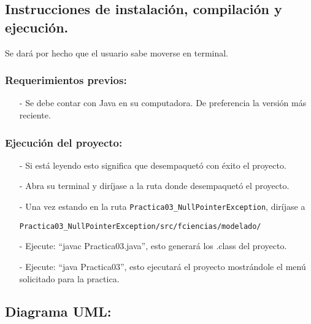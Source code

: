 \documentclass{article}
\newcommand{\code}[1]{\textcolor{white!25!black}{\texttt{#1}}}
\begin{document}
\subsection*{Instrucciones de instalación, compilación y ejecución.}
Se dará por hecho que el usuario sabe moverse en terminal.\\

\subsubsection*{Requerimientos previos:}
\begin{itemize}
\item[-] Se debe contar con Java en su computadora. De preferencia la versión más reciente.
\end{itemize}

\subsubsection*{Ejecución del proyecto:}
\begin{itemize}
\item[-] Si está leyendo esto significa que desempaquetó con éxito el proyecto.
\item[-] Abra su terminal y diríjase a la ruta donde desempaquetó el proyecto.
\item[-] Una vez estando en la ruta \code{Practica03\_NullPointerException}, diríjase a

  \code{Practica03\_NullPointerException/src/fciencias/modelado/}
\item[-] Ejecute: “javac Practica03.java”, esto generará los .class del proyecto.
\item[-] Ejecute: “java Practica03”, esto ejecutará el proyecto mostrándole el menú solicitado para la practica.
\end{itemize}

\newpage
\subsection*{Diagrama UML:}
\end{document}

